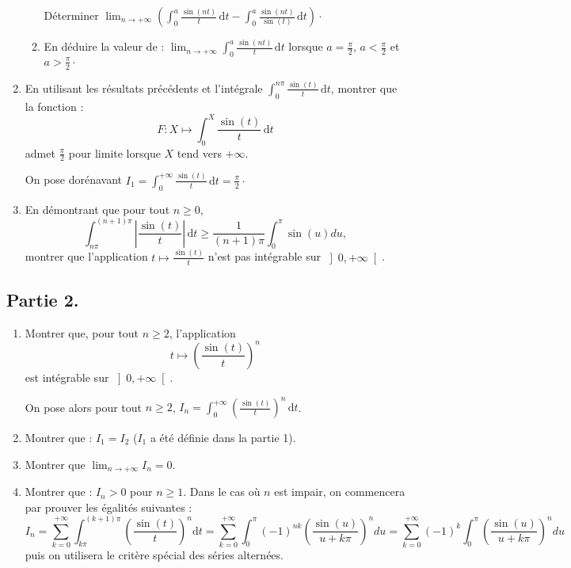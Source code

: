 \documentclass[a4paper,french,11pt,twoside]{VcCours}
\newcommand{\dt}{\text{d}t}
\begin{document}
\begin{enumerate}
\begin{enumerate}
\medskip

Déterminer $\lim_{n \rightarrow +\infty} \left( \int_0^a \frac{\sin(nt)}{t} \, \dt - \int_0^a \frac{\sin(nt)}{\sin(t)} \, \dt \right)\cdot$
\item En déduire la valeur de : $\lim_{n \rightarrow +\infty} \int_0^a \frac{\sin(nt)}{t} \, \dt$ lorsque $a = \frac{\pi}{2}$, $a < \frac{\pi}{2}$ et $a > \frac{\pi}{2}\cdot$
\end{enumerate}
\item En utilisant les résultats précédents et l'intégrale $\int_0^{n \pi} \frac{\sin(t)}{t} \, \dt$, montrer que la fonction :
$$F : X \mapsto \int_0^X \frac{\sin(t)}{t} \, \dt$$
admet $\frac{\pi}{2}$ pour limite lorsque $X$ tend vers $+\infty$.

\medskip

On pose dorénavant $I_1 = \int_0^{+\infty} \frac{\sin(t)}{t} \, \dt = \frac{\pi}{2}\cdot$
\item En démontrant que pour tout $n \geq 0$, 
$$\int_{n \pi}^{(n+1) \pi} \left\vert \frac{\sin(t)}{t} \right\vert \, \dt \geq \frac{1}{(n+1) \pi} \int_{0}^{\pi} \sin(u) du,$$
montrer que l'application 
$ t \mapsto \frac{\sin(t)}{t} $ n'est pas intégrable sur $\left]0, +\infty \right[$.
\end{enumerate}

\bigskip

\subsection*{Partie 2.}

\bigskip

\begin{enumerate}
\item Montrer que, pour tout $n \geq 2$, l'application 
$$t \mapsto \left( \frac{\sin(t)}{t} \right)^n $$
est intégrable sur $\left]0, +\infty \right[$.

\medskip

On pose alors pour tout $n \geq 2$, $I_n = \int_0^{+\infty} \left( \frac{\sin(t)}{t} \right)^n  \, \dt$.
\item Montrer que : $I_1 = I_2$ ($I_1$ a été définie dans la partie 1).
\item Montrer que $\lim_{n \rightarrow +\infty} I_n = 0$.
\item Montrer que : $I_n > 0$ pour $n \geq 1$. Dans le cas où $n$ est impair, on commencera par prouver les égalités suivantes :
$$ I_n = \sum_{k=0}^{+ \infty} \int_{k \pi}^{(k+1)\pi} \left( \frac{\sin(t)}{t} \right)^n \dt =  \sum_{k=0}^{+ \infty} \int_{0}^{\pi} (-1)^{nk} \left( \frac{\sin(u)}{u+k \pi} \right)^n du = \sum_{k=0}^{+ \infty} (-1)^{k} \int_{0}^{\pi}  \left( \frac{\sin(u)}{u+k \pi} \right)^n du$$
puis on utilisera le critère spécial des séries alternées.
\end{enumerate}
\end{document}
